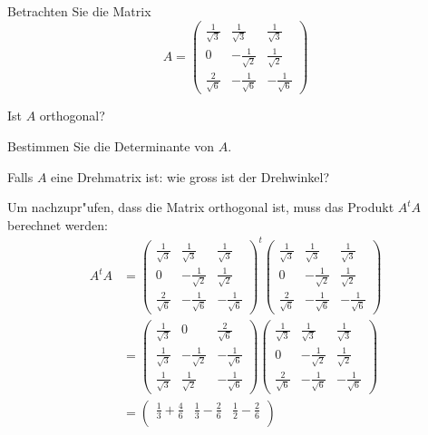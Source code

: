Betrachten Sie die Matrix
\[
A=
\begin{pmatrix}
\frac1{\sqrt{3}}&\frac1{\sqrt{3}}&\frac1{\sqrt{3}}\\
0&-\frac1{\sqrt{2}}&\frac1{\sqrt{2}}\\
\frac2{\sqrt{6}}&-\frac1{\sqrt{6}}&-\frac1{\sqrt{6}}
\end{pmatrix}
\]
\begin{teilaufgaben}
\item
Ist $A$ orthogonal?
\item
Bestimmen Sie die Determinante von $A$.
\item
Falls $A$ eine  Drehmatrix ist: wie gross ist der Drehwinkel?
\end{teilaufgaben}

\begin{loesung}
\begin{teilaufgaben}
\item
Um nachzupr"ufen, dass die Matrix orthogonal ist, muss das Produkt
$A^tA$ berechnet werden:
\begin{align*}
A^tA
&=
\begin{pmatrix}
\frac1{\sqrt{3}}&\frac1{\sqrt{3}}&\frac1{\sqrt{3}}\\
0&-\frac1{\sqrt{2}}&\frac1{\sqrt{2}}\\
\frac2{\sqrt{6}}&-\frac1{\sqrt{6}}&-\frac1{\sqrt{6}}
\end{pmatrix}^t
\begin{pmatrix}
\frac1{\sqrt{3}}&\frac1{\sqrt{3}}&\frac1{\sqrt{3}}\\
0&-\frac1{\sqrt{2}}&\frac1{\sqrt{2}}\\
\frac2{\sqrt{6}}&-\frac1{\sqrt{6}}&-\frac1{\sqrt{6}}
\end{pmatrix}
\\
&=
\begin{pmatrix}
\frac1{\sqrt{3}}&0&\frac2{\sqrt{6}}\\
\frac1{\sqrt{3}}&-\frac1{\sqrt{2}}&-\frac1{\sqrt{6}}\\
\frac1{\sqrt{3}}&\frac1{\sqrt{2}}&-\frac1{\sqrt{6}}
\end{pmatrix}
\begin{pmatrix}
\frac1{\sqrt{3}}&\frac1{\sqrt{3}}&\frac1{\sqrt{3}}\\
0&-\frac1{\sqrt{2}}&\frac1{\sqrt{2}}\\
\frac2{\sqrt{6}}&-\frac1{\sqrt{6}}&-\frac1{\sqrt{6}}
\end{pmatrix}
\\
&=
\begin{pmatrix}
\frac13+\frac46 & \frac13-\frac26         & \frac12 -\frac26       \\

\end{pmatrix}
\end{align*}
\end{teilaufgaben}
\end{loesung}
